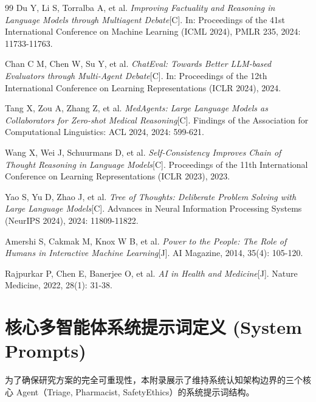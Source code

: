 \documentclass[11pt,a4paper]{ctexart}
\begin{document}
\begin{thebibliography}{99}
Du Y, Li S, Torralba A, et al.
\emph{Improving Factuality and Reasoning in Language Models through Multiagent Debate}[C].
In: Proceedings of the 41st International Conference on Machine Learning (ICML 2024), PMLR 235, 2024: 11733-11763.

Chan C M, Chen W, Su Y, et al.
\emph{ChatEval: Towards Better LLM-based Evaluators through Multi-Agent Debate}[C].
In: Proceedings of the 12th International Conference on Learning Representations (ICLR 2024), 2024.

Tang X, Zou A, Zhang Z, et al.
\emph{MedAgents: Large Language Models as Collaborators for Zero-shot Medical Reasoning}[C].
Findings of the Association for Computational Linguistics: ACL 2024, 2024: 599-621.

Wang X, Wei J, Schuurmans D, et al.
\emph{Self-Consistency Improves Chain of Thought Reasoning in Language Models}[C].
Proceedings of the 11th International Conference on Learning Representations (ICLR 2023), 2023.

Yao S, Yu D, Zhao J, et al.
\emph{Tree of Thoughts: Deliberate Problem Solving with Large Language Models}[C].
Advances in Neural Information Processing Systems (NeurIPS 2024), 2024: 11809-11822.

Amershi S, Cakmak M, Knox W B, et al.
\emph{Power to the People: The Role of Humans in Interactive Machine Learning}[J].
AI Magazine, 2014, 35(4): 105-120.

Rajpurkar P, Chen E, Banerjee O, et al.
\emph{AI in Health and Medicine}[J].
Nature Medicine, 2022, 28(1): 31-38.

\end{thebibliography}

\newpage
\appendix
\renewcommand\thesection{附录 \Alph{section}}

\section{核心多智能体系统提示词定义 (System Prompts)}
为了确保研究方案的完全可重现性，本附录展示了维持系统认知架构边界的三个核心 Agent（Triage, Pharmacist, SafetyEthics）的系统提示词结构。
\end{document}

